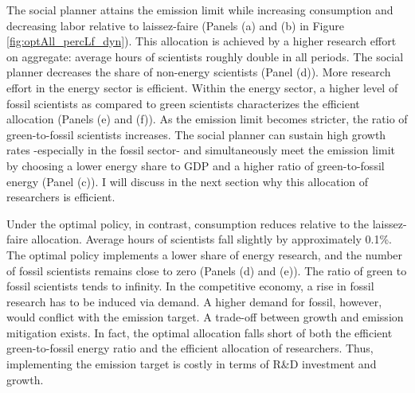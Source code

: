 \begin{figure}[h!!!]
\begin{subfigure}[]{1\textwidth}
\begin{subfigure}[]{0.4\textwidth}
\end{subfigure}
\end{subfigure}
\end{figure} 
%
The social planner attains the emission limit while increasing consumption and decreasing labor  relative to laissez-faire (Panels (a) and (b) in Figure \ref{fig:optAll_percLf_dyn}). This allocation is achieved by a higher research effort on aggregate: average hours of scientists roughly double in all periods. The social planner decreases the share of non-energy scientists (Panel (d)). More research effort in the energy sector is efficient. Within the energy sector, a higher level of fossil scientists as compared to green scientists characterizes the efficient allocation (Panels (e) and (f)). As the emission limit becomes stricter, the ratio of green-to-fossil scientists increases.
The social planner can sustain high growth rates -especially in the fossil sector- and simultaneously meet the emission limit by choosing a lower energy share to GDP and a higher ratio of green-to-fossil energy (Panel (c)).  I will discuss in the next section why this allocation of researchers is efficient.


Under the optimal policy, in contrast, consumption reduces relative to the laissez-faire allocation. Average hours of scientists fall slightly by approximately 0.1\%. The optimal policy implements a lower share of energy research, and the number of fossil scientists remains close to zero (Panels (d) and (e)). The ratio of green to fossil scientists tends to infinity. 
In the competitive economy, a rise in fossil research has to be induced via demand. A higher demand for fossil, however, would conflict with the emission target. A trade-off between growth and emission mitigation exists.  In fact, the optimal allocation falls short of both the efficient green-to-fossil energy ratio and the efficient allocation of researchers. Thus, implementing the emission target is costly in terms of R\&D investment and growth.

